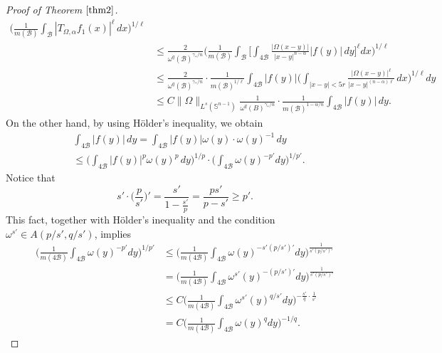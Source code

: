 \documentclass[preprint,10pt]{elsarticle}
\numberwithin{equation}{section}
\begin{document}
\begin{proof}[Proof of Theorem $\ref{thm2}$]
\begin{equation*}
\begin{split}
\bigg(\frac{1}{m(\mathcal{B})}\int_{\mathcal{B}}|T_{\Omega,\alpha}f_1(x)|^{\ell}\,dx\bigg)^{1/{\ell}}\\
&\leq\frac{2}{\omega^q(\mathcal{B})^{{\gamma_*}/n}}
\bigg(\frac{1}{m(\mathcal{B})}\int_{\mathcal{B}}\bigg[\int_{4\mathcal{B}}\frac{|\Omega(x-y)|}{|x-y|^{n-\alpha}}|f(y)|\,dy\bigg]^{\ell}dx\bigg)^{1/{\ell}}\\
&\leq\frac{2}{\omega^q(\mathcal{B})^{{\gamma_*}/n}}\cdot\frac{1}{m(\mathcal{B})^{1/{\ell}}}
\int_{4\mathcal{B}}|f(y)|\bigg(\int_{|x-y|<5r}\frac{|\Omega(x-y)|^{\ell}}{|x-y|^{(n-\alpha)\ell}}\,dx\bigg)^{1/{\ell}}dy\\
&\leq C\|\Omega\|_{L^s(\mathbb{S}^{n-1})}
\frac{1}{\omega^q(B)^{{\gamma_*}/n}}\cdot\frac{1}{m(\mathcal{B})^{1-\alpha/n}}\int_{4\mathcal{B}}|f(y)|\,dy.
\end{split}
\end{equation*}
On the other hand, by using H\"older's inequality, we obtain
\begin{equation}\label{cal22}
\begin{split}
&\int_{4\mathcal{B}}|f(y)|\,dy=\int_{4\mathcal{B}}|f(y)|\omega(y)\cdot\omega(y)^{-1}\,dy\\
&\leq\bigg(\int_{4\mathcal{B}}|f(y)|^p\omega(y)^p\,dy\bigg)^{1/p}
\cdot\bigg(\int_{4\mathcal{B}} \omega(y)^{-p'}dy\bigg)^{1/{p'}}.
\end{split}
\end{equation}
Notice that
\begin{equation}
s'\cdot\Big(\frac{p}{s'}\Big)'=\frac{s'}{1-\frac{s'}{p}}=\frac{ps'}{p-s'}\geq p'.
\end{equation}
This fact, together with H\"older's inequality and the condition $\omega^{s'}\in A(p/{s'},q/{s'})$, implies
\begin{equation}\label{cal23}
\begin{split}
\bigg(\frac{1}{m(4\mathcal{B})}\int_{4\mathcal{B}}\omega(y)^{-p'}dy\bigg)^{1/{p'}}
&\leq\bigg(\frac{1}{m(4\mathcal{B})}\int_{4\mathcal{B}} \omega(y)^{-s'(p/{s'})'}dy\bigg)^{\frac{1}{s'(p/{s'})'}}\\
&=\bigg(\frac{1}{m(4\mathcal{B})}\int_{4\mathcal{B}}\omega^{s'}(y)^{-(p/{s'})'}dy\bigg)^{\frac{1}{s'(p/{s'})'}}\\
&\leq C\bigg(\frac{1}{m(4\mathcal{B})}\int_{4\mathcal{B}}\omega^{s'}(y)^{{q}/{s'}}dy\bigg)^{-\frac{s'}{q}\cdot\frac{1}{s'}}\\
&=C\bigg(\frac{1}{m(4\mathcal{B})}\int_{4\mathcal{B}}\omega(y)^{q}dy\bigg)^{-1/{q}}.
\end{split}
\end{equation}

\end{proof}
\end{document}
